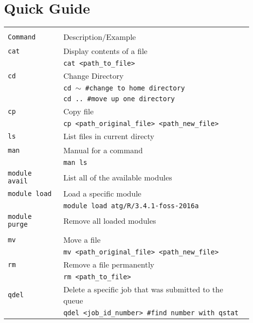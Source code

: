 \section{Quick Guide}

\begin{table}[!h]
  \begin{tabular}{ L{3cm}  L{9cm}}
    \hline
    \\
    \texttt{Command} & Description/Example \\
    \hline \hline
    \texttt{cat} & Display contents of a file \\
                     & \texttt{cat <path\_to\_file>}\\[2ex]
    
    \texttt{cd} & Change Directory
    \\
                     & \texttt{cd $\sim$   \#change to home directory}\\
                     & \texttt{cd ..  \#move up one directory}\\[2ex]
    \texttt{cp} & Copy file
    \\
                     &\texttt{cp <path\_original\_file> <path\_new\_file>}
    \\[2ex]
    \texttt{ls} & List files in current directy
    \\[4ex]
    \texttt{man} & Manual for a command\\
                     & \texttt{man ls}
    \\[2ex]
    \texttt{module avail} & List all of the available modules
    \\[4ex]
    \texttt{module load} & Load a specific module\\
                     & \texttt{module load atg/R/3.4.1-foss-2016a}    
    \\[2ex]
    \texttt{module purge} & Remove all loaded modules\\
    \\[2ex]
    \texttt{mv} & Move a file\\
                     &\texttt{mv <path\_original\_file> <path\_new\_file>}
    \\[2ex]
    \texttt{rm} & Remove a file permanently\\
                     & \texttt{rm <path\_to\_file>}
    \\[2ex]
    \texttt{qdel} & Delete a specific job that was submitted to the queue\\
                     & \texttt{qdel <job\_id\_number> \#find number with qstat}
    \\[2ex]

\end{tabular}
\end{table}

